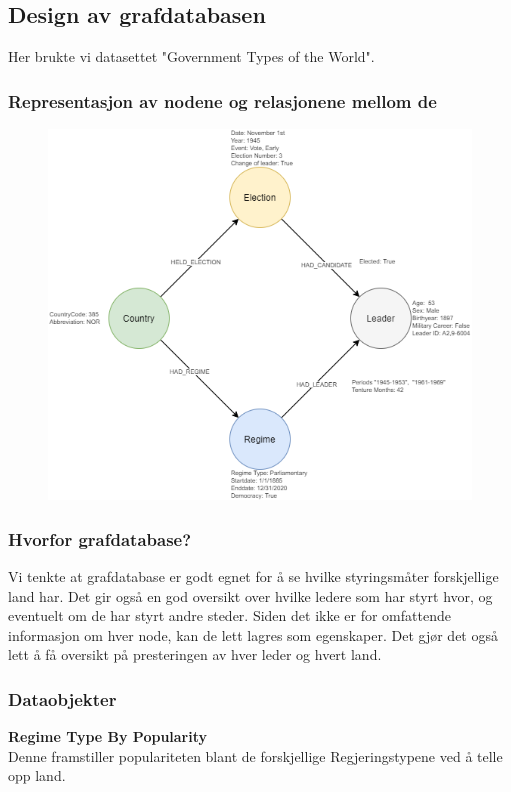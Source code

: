 
\subsection{Design av grafdatabasen}
Her brukte vi datasettet "Government Types of the World".

\subsubsection{Representasjon av nodene og relasjonene mellom de}
\FigureCounter
\begin{figure}[H]
  \includegraphics[scale=0.5]{images/milepael4/graph_database_base.drawio.png}
\end{figure}

\subsubsection{Hvorfor grafdatabase?}
Vi tenkte at grafdatabase er godt egnet for å se hvilke styringsmåter forskjellige land har. Det gir 
også en god oversikt over hvilke ledere som har styrt hvor, og eventuelt om de har styrt andre 
steder. Siden det ikke er for omfattende informasjon om hver node, kan de lett lagres som 
egenskaper. Det gjør det også lett å få oversikt på presteringen av hver leder og hvert land.

\subsubsection{Dataobjekter}
\textbf{Regime Type By Popularity}\\
Denne framstiller populariteten blant de forskjellige Regjeringstypene ved å telle opp land.

